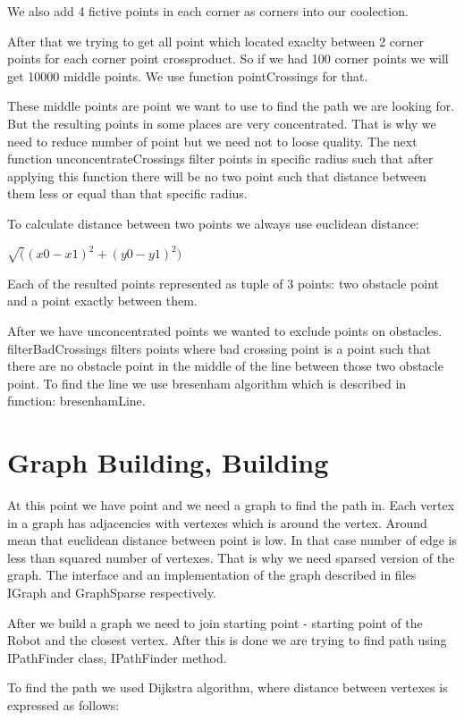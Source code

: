 \documentclass[12pt]{article}
\begin{document}
We also add 4 fictive points in each corner as corners into our coolection.

After that we trying to get all point which located exaclty between 2 corner points for each corner point crossproduct. So if we had 100 corner points we will get 10000 middle points. We use function pointCrossings for that.

These middle points are point we want to use to find the path we are looking for. But the resulting points in some places are very concentrated. That is why we need to reduce number of point but we need not to loose quality. The next function unconcentrateCrossings filter points in specific radius such that after applying this function there will be no two point such that distance between them less or equal than that specific radius.

To calculate distance between two points we always use euclidean distance:

    $\sqrt((x0-x1)^2 + (y0-y1)^2)$

Each of the resulted points represented as tuple of 3 points: two obstacle point and a point exactly between them.

After we have unconcentrated points we wanted to exclude points on obstacles. filterBadCrossings filters points where bad crossing point is a point such that there are no obstacle point in the middle of the line between those two obstacle point. To find the line we use bresenham algorithm which is described in function: bresenhamLine.

\section{Graph Building, Building}

At this point we have point and we need a graph to find the path in. Each vertex in a graph has adjacencies with vertexes which is around the vertex. Around mean that euclidean distance between point is low. In that case number of edge is less than squared number of vertexes. That is why we need sparsed version of the graph. The interface and an implementation of the graph described in files IGraph and GraphSparse respectively.

After we build a graph we need to join starting point - starting point of the Robot and the closest vertex. After this is done we are trying to find path using IPathFinder class, IPathFinder method.

To find the path we used Dijkstra algorithm, where distance between vertexes is expressed as follows:
\end{document}
